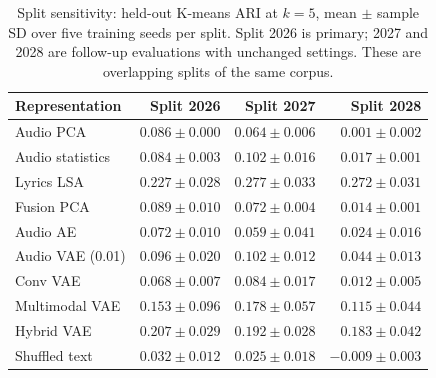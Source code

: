 \begin{table}[htbp]
\centering
\small
\caption{Split sensitivity: held-out K-means ARI at $k=5$, mean $\pm$ sample SD over five training seeds per split. Split 2026 is primary; 2027 and 2028 are follow-up evaluations with unchanged settings. These are overlapping splits of the same corpus.}
\label{tab:robustness}
\begin{tabular}{lrrr}
\toprule
Representation & Split 2026 & Split 2027 & Split 2028 \\
\midrule
Audio PCA & $0.086\pm0.000$ & $0.064\pm0.006$ & $0.001\pm0.002$ \\
Audio statistics & $0.084\pm0.003$ & $0.102\pm0.016$ & $0.017\pm0.001$ \\
Lyrics LSA & $0.227\pm0.028$ & $0.277\pm0.033$ & $0.272\pm0.031$ \\
Fusion PCA & $0.089\pm0.010$ & $0.072\pm0.004$ & $0.014\pm0.001$ \\
Audio AE & $0.072\pm0.010$ & $0.059\pm0.041$ & $0.024\pm0.016$ \\
Audio VAE (0.01) & $0.096\pm0.020$ & $0.102\pm0.012$ & $0.044\pm0.013$ \\
Conv VAE & $0.068\pm0.007$ & $0.084\pm0.017$ & $0.012\pm0.005$ \\
Multimodal VAE & $0.153\pm0.096$ & $0.178\pm0.057$ & $0.115\pm0.044$ \\
Hybrid VAE & $0.207\pm0.029$ & $0.192\pm0.028$ & $0.183\pm0.042$ \\
Shuffled text & $0.032\pm0.012$ & $0.025\pm0.018$ & $-0.009\pm0.003$ \\
\bottomrule
\end{tabular}
\end{table}
